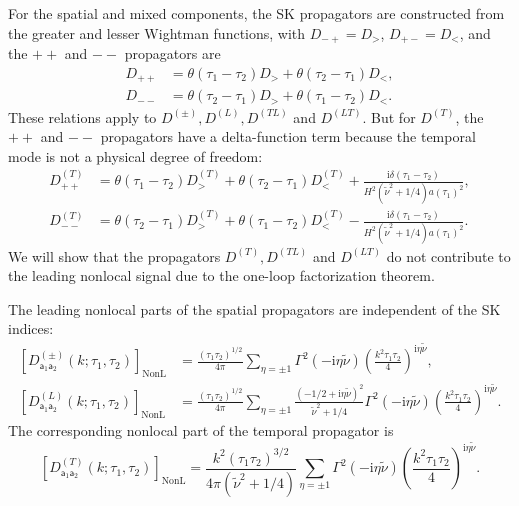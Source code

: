 \documentclass[a4paper,12pt]{article}
\def\ii{\mathrm{i}}
\def\tn{\tilde\nu}
\def\aa{\mathsf{a}}
\begin{document}
For the spatial and mixed components, the SK propagators are constructed from the greater and lesser Wightman functions, with $D_{-+}=D_>$, $D_{+-}=D_<$, and the $++$ and $--$ propagators are
\begin{align}
    D_{++}&=\theta(\tau_1-\tau_2)D_>
              +\theta(\tau_2-\tau_1)D_<,\nonumber\\
    D_{--}&=\theta(\tau_2-\tau_1)D_>
              +\theta(\tau_1-\tau_2)D_<.
    \label{eq:sk-prescription}
\end{align}
These relations apply to $D^{(\pm)},D^{(L)},D^{(TL)}$ and $D^{(LT)}$.
But for $D^{(T)}$, the $++$ and $--$ propagators have a delta-function term because the temporal mode is not a physical degree of freedom:
\begin{align}
    D_{++}^{(T)}&=\theta(\tau_1-\tau_2)D_>^{(T)}
              +\theta(\tau_2-\tau_1)D_<^{(T)} + \frac{\ii \delta(\tau_1-\tau_2)}{H^2(\tn^2+1/4) a(\tau_1)^2} ,\nonumber\\
    D_{--}^{(T)}&=\theta(\tau_2-\tau_1)D_>^{(T)}
              +\theta(\tau_1-\tau_2)D_<^{(T)} - \frac{\ii \delta(\tau_1-\tau_2)}{H^2(\tn^2+1/4) a(\tau_1)^2}.
\end{align}
We will show that the propagators $D^{(T)},D^{(TL)}$ and $D^{(LT)}$ do not contribute to the leading nonlocal signal due to the one-loop factorization theorem.

The leading nonlocal parts of the spatial propagators are independent of the SK indices:
\begin{align}
    \left[D^{(\pm)}_{\aa_1\aa_2}(k;\tau_1,\tau_2)\right]_{\mathrm{NonL}}
    &=\frac{(\tau_1\tau_2)^{1/2}}{4\pi}
      \sum_{\eta=\pm1}\Gamma^2(-\ii\eta\tilde\nu)
      \left(\frac{k^2\tau_1\tau_2}{4}\right)^{\ii\eta\tilde\nu},
      \label{eq:transverse-nonlocal}\\
    \left[D^{(L)}_{\aa_1\aa_2}(k;\tau_1,\tau_2)\right]_{\mathrm{NonL}}
    &=\frac{(\tau_1\tau_2)^{1/2}}{4\pi}
      \sum_{\eta=\pm1}
      \frac{(-1/2+\ii\eta\tilde\nu)^2}{\tilde\nu^2+1/4}
      \Gamma^2(-\ii\eta\tilde\nu)
      \left(\frac{k^2\tau_1\tau_2}{4}\right)^{\ii\eta\tilde\nu}.
    \label{eq:longitudinal-nonlocal}
\end{align}
The corresponding nonlocal part of the temporal propagator is
\begin{equation}
    \left[D^{(T)}_{\aa_1\aa_2}(k;\tau_1,\tau_2)\right]_{\mathrm{NonL}}
    =\frac{k^2(\tau_1\tau_2)^{3/2}}
    {4\pi(\tilde\nu^2+1/4)}
    \sum_{\eta=\pm1}\Gamma^2(-\ii\eta\tilde\nu)
    \left(\frac{k^2\tau_1\tau_2}{4}\right)^{\ii\eta\tilde\nu}.
    \label{eq:temporal-nonlocal}
\end{equation}
\end{document}
